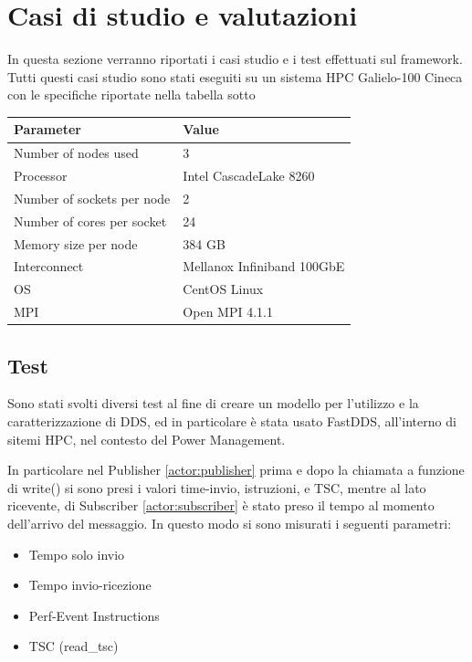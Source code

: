 \chapter{Casi di studio e valutazioni}
In questa sezione verranno riportati i casi studio e i test effettuati sul framework. Tutti questi casi studio sono stati eseguiti su un sistema HPC Galielo-100 Cineca con le specifiche riportate nella tabella sotto

\vspace{.7cm}
\begin{center}

\begin{tabular}{l|l}
    \hline
    \textbf{Parameter} & \textbf{Value} \\
    \hline
    Number of nodes used & 3 \\
    \hline
    Processor & Intel CascadeLake 8260 \\
    \hline
    Number of sockets per node & 2 \\
    \hline
    Number of cores per socket & 24 \\
    \hline
    Memory size per node & 384 GB \\
    \hline
    Interconnect & Mellanox Infiniband 100GbE \\
    \hline
    OS & CentOS Linux \\ 
    \hline
    MPI & Open MPI  4.1.1 \\
    \hline
\end{tabular}
\end{center}


\section{Test}
Sono stati svolti diversi test al fine di creare un modello per l'utilizzo e la caratterizzazione di DDS, ed in particolare è stata usato FastDDS, all'interno di sitemi HPC, nel contesto del Power Management. 

In particolare nel Publisher \ref{actor:publisher} prima e dopo la chiamata a funzione di write() %
si sono presi i valori time-invio, istruzioni, e TSC, mentre al lato ricevente, di Subscriber \ref{actor:subscriber} è stato preso il tempo al momento dell'arrivo del messaggio. In questo modo si sono misurati i seguenti parametri:
\begin{itemize}
    \item Tempo solo invio
    \item Tempo invio-ricezione
    \item Perf-Event Instructions
    \item TSC (read\_tsc)
\end{itemize}
